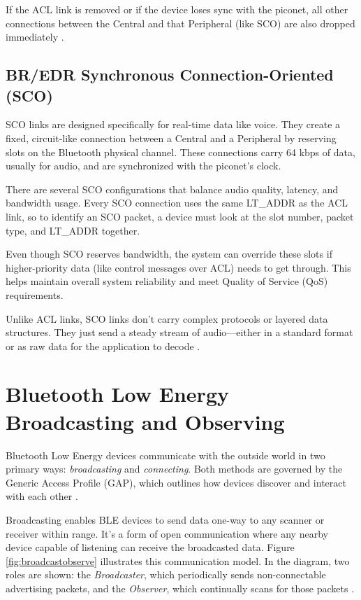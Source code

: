 If the ACL link is removed or if the device loses sync with the piconet, all other connections between the Central and that Peripheral (like SCO) are also dropped immediately \cite{bluetoothcorespec6}.

\subsection{BR/EDR Synchronous Connection-Oriented (SCO)}

SCO links are designed specifically for real-time data like voice. They create a fixed, circuit-like connection between a Central and a Peripheral by reserving slots on the Bluetooth physical channel. These connections carry 64 kbps of data, usually for audio, and are synchronized with the piconet’s clock.

There are several SCO configurations that balance audio quality, latency, and bandwidth usage. Every SCO connection uses the same LT\_ADDR as the ACL link, so to identify an SCO packet, a device must look at the slot number, packet type, and LT\_ADDR together.

Even though SCO reserves bandwidth, the system can override these slots if higher-priority data (like control messages over ACL) needs to get through. This helps maintain overall system reliability and meet Quality of Service (QoS) requirements.

Unlike ACL links, SCO links don’t carry complex protocols or layered data structures. They just send a steady stream of audio—either in a standard format or as raw data for the application to decode \cite{bluetoothcorespec6}.

\section{Bluetooth Low Energy Broadcasting and Observing}

Bluetooth Low Energy devices communicate with the outside world in two primary ways: \textit{broadcasting} and \textit{connecting}. Both methods are governed by the Generic Access Profile (GAP), which outlines how devices discover and interact with each other \cite{gettingstartedwble}.

Broadcasting enables BLE devices to send data one-way to any scanner or receiver within range. It’s a form of open communication where any nearby device capable of listening can receive the broadcasted data. Figure \ref{fig:broadcastobserve} illustrates this communication model. In the diagram, two roles are shown: the \textit{Broadcaster}, which periodically sends non-connectable advertising packets, and the \textit{Observer}, which continually scans for those packets \cite{gettingstartedwble}.

